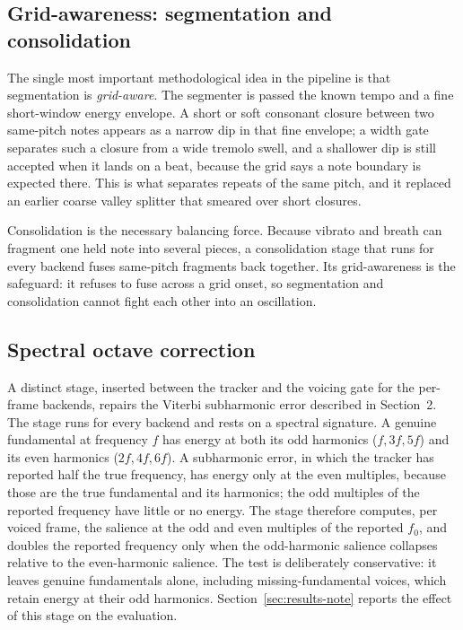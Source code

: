\documentclass[12pt,a4paper]{article}
\begin{document}
\subsection{Grid-awareness: segmentation and consolidation}

The single most important methodological idea in the pipeline is that
segmentation is \emph{grid-aware}. The segmenter is passed the known tempo and
a fine short-window energy envelope. A short or soft consonant closure between
two same-pitch notes appears as a narrow dip in that fine envelope; a width
gate separates such a closure from a wide tremolo swell, and a shallower dip is
still accepted when it lands on a beat, because the grid says a note boundary is
expected there. This is what separates repeats of the same pitch, and it
replaced an earlier coarse valley splitter that smeared over short closures.

Consolidation is the necessary balancing force. Because vibrato and breath can
fragment one held note into several pieces, a consolidation
stage that runs for every backend fuses same-pitch fragments back together. Its grid-awareness is the safeguard: it refuses to fuse across a grid onset, so segmentation and
consolidation cannot fight each other into an oscillation.

\subsection{Spectral octave correction}
\label{sec:octave}

A distinct stage, inserted between the tracker and the voicing gate for the
per-frame backends, repairs the Viterbi subharmonic error described in
Section~2. The stage runs for every backend and rests on a spectral signature. A
genuine fundamental at frequency $f$ has energy at both its odd harmonics
($f, 3f, 5f$) and its even harmonics ($2f, 4f, 6f$). A subharmonic error, in
which the tracker has reported half the true frequency, has energy only at the
even multiples, because those are the true fundamental and its harmonics; the
odd multiples of the reported frequency have little or no energy. The stage
therefore computes, per voiced frame, the salience at the odd and even
multiples of the reported $f_0$, and doubles the reported frequency only when
the odd-harmonic salience collapses relative to the even-harmonic salience. The
test is deliberately conservative: it leaves genuine fundamentals alone,
including missing-fundamental voices, which retain energy at their odd
harmonics. Section~\ref{sec:results-note} reports the effect of this stage on
the evaluation.
\end{document}
